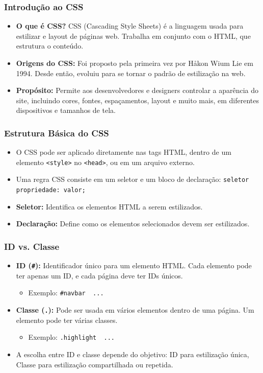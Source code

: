 \begin{frame}[fragile]
  \frametitle{Introdução ao CSS}
  \begin{itemize}
    \item \textbf{O que é CSS?} CSS (Cascading Style Sheets) é a linguagem usada para estilizar e layout de páginas web. Trabalha em conjunto com o HTML, que estrutura o conteúdo.
    \item \textbf{Origens do CSS:} Foi proposto pela primeira vez por Håkon Wium Lie em 1994. Desde então, evoluiu para se tornar o padrão de estilização na web.
    \item \textbf{Propósito:} Permite aos desenvolvedores e designers controlar a aparência do site, incluindo cores, fontes, espaçamentos, layout e muito mais, em diferentes dispositivos e tamanhos de tela.
  \end{itemize}
\end{frame}

\begin{frame}[fragile]
  \frametitle{Estrutura Básica do CSS}
  \begin{itemize}
    \item O CSS pode ser aplicado diretamente nas tags HTML, dentro de um elemento \texttt{<style>} no \texttt{<head>}, ou em um arquivo externo.
    \item Uma regra CSS consiste em um seletor e um bloco de declaração: \texttt{seletor { propriedade: valor; }}
    \item \textbf{Seletor:} Identifica os elementos HTML a serem estilizados.
    \item \textbf{Declaração:} Define como os elementos selecionados devem ser estilizados.
  \end{itemize}
\end{frame}

\begin{frame}[fragile]
  \frametitle{ID vs. Classe}
  \begin{itemize}
    \item \textbf{ID (\texttt{\#}):} Identificador único para um elemento HTML. Cada elemento pode ter apenas um ID, e cada página deve ter IDs únicos.
      \begin{itemize}
        \item Exemplo: \texttt{\#navbar { ... }}
      \end{itemize}
    \item \textbf{Classe (\texttt{.}):} Pode ser usada em vários elementos dentro de uma página. Um elemento pode ter várias classes.
      \begin{itemize}
        \item Exemplo: \texttt{.highlight { ... }}
      \end{itemize}
    \item A escolha entre ID e classe depende do objetivo: ID para estilização única, Classe para estilização compartilhada ou repetida.
  \end{itemize}
\end{frame}

